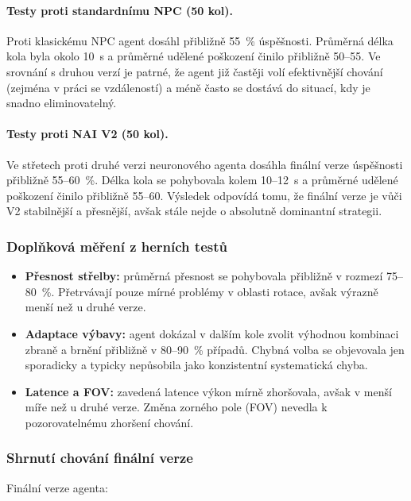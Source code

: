 \paragraph{Testy proti standardnímu NPC (50 kol).}
Proti klasickému NPC agent dosáhl přibližně 55~\% úspěšnosti. Průměrná délka kola byla okolo 10~s a průměrné udělené poškození činilo přibližně 50--55. Ve srovnání s druhou verzí je patrné, že agent již častěji volí efektivnější chování (zejména v práci se vzdáleností) a méně často se dostává do situací, kdy je snadno eliminovatelný.

\paragraph{Testy proti NAI V2 (50 kol).}
Ve střetech proti druhé verzi neuronového agenta dosáhla finální verze úspěšnosti přibližně 55--60~\%. Délka kola se pohybovala kolem 10--12~s a průměrné udělené poškození činilo přibližně 55--60. Výsledek odpovídá tomu, že finální verze je vůči V2 stabilnější a přesnější, avšak stále nejde o absolutně dominantní strategii.

\subsubsection{Doplňková měření z herních testů}

\begin{itemize}
    \item \textbf{Přesnost střelby:} průměrná přesnost se pohybovala přibližně v rozmezí 75--80~\%. Přetrvávají pouze mírné problémy v oblasti rotace, avšak výrazně menší než u druhé verze.
    \item \textbf{Adaptace výbavy:} agent dokázal v dalším kole zvolit výhodnou kombinaci zbraně a brnění přibližně v 80--90~\% případů. Chybná volba se objevovala jen sporadicky a typicky nepůsobila jako konzistentní systematická chyba.
    \item \textbf{Latence a FOV:} zavedená latence výkon mírně zhoršovala, avšak v menší míře než u druhé verze. Změna zorného pole (FOV) nevedla k pozorovatelnému zhoršení chování.
\end{itemize}

\subsubsection{Shrnutí chování finální verze}

Finální verze agenta:

